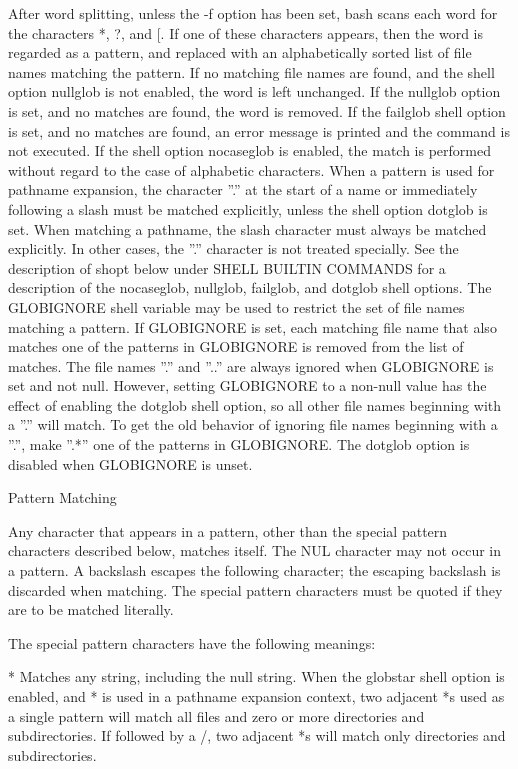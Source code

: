 \documentclass[11pt]{article}
\begin{document}
{{{After word splitting, unless the -f option has been set, bash scans each word for the characters *, ?, and [. If one of these characters appears, then the word is regarded as a pattern, and replaced with an alphabetically sorted list of file names matching the pattern. If no matching file names are found, and the shell option nullglob is not enabled, the word is left unchanged. If the nullglob option is set, and no matches are found, the word is removed. If the failglob shell option is set, and no matches are found, an error message is printed and the command is not executed. If the shell option nocaseglob is enabled, the match is performed without regard to the case of alphabetic characters. When a pattern is used for pathname expansion, the character ''.'' at the start of a name or immediately following a slash must be matched explicitly, unless the shell option dotglob is set. When matching a pathname, the slash character must always be matched explicitly. In other cases, the ''.'' character is not treated specially. See the description of shopt below under SHELL BUILTIN COMMANDS for a description of the nocaseglob, nullglob, failglob, and dotglob shell options.
The GLOBIGNORE shell variable may be used to restrict the set of file names matching a pattern. If GLOBIGNORE is set, each matching file name that also matches one of the patterns in GLOBIGNORE is removed from the list of matches. The file names ''.'' and ''..'' are always ignored when GLOBIGNORE is set and not null. However, setting GLOBIGNORE to a non-null value has the effect of enabling the dotglob shell option, so all other file names beginning with a ''.'' will match. To get the old behavior of ignoring file names beginning with a ''.'', make ''.*'' one of the patterns in GLOBIGNORE. The dotglob option is disabled when GLOBIGNORE is unset.

Pattern Matching

Any character that appears in a pattern, other than the special pattern characters described below, matches itself. The NUL character may not occur in a pattern. A backslash escapes the following character; the escaping backslash is discarded when matching. The special pattern characters must be quoted if they are to be matched literally.

The special pattern characters have the following meanings:

*
Matches any string, including the null string. When the globstar shell option is enabled, and * is used in a pathname expansion context, two adjacent *s used as a single pattern will match all files and zero or more directories and subdirectories. If followed by a /, two adjacent *s will match only directories and subdirectories.

}}}
\end{document}
